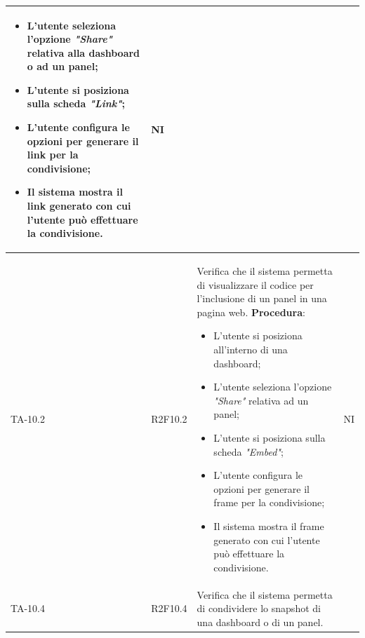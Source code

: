 \begin{longtable}{|C{2.5cm}|C{2.5cm}|L{6.5cm}|C{1.5cm}|}
\begin{itemize}
		\item L'utente seleziona l'opzione \emph{"Share"} relativa alla dashboard o ad un panel;
		\item L'utente si posiziona sulla scheda \emph{"Link"};
		\item L'utente configura le opzioni per generare il link per la condivisione;
		\item Il sistema mostra il link generato con cui l'utente può effettuare la condivisione.
	\end{itemize}
	 & {NI}\\
	\hline
	{TA-10.2} & {R2F10.2} & 
	Verifica che il sistema permetta di visualizzare il codice per l'inclusione di un panel in una pagina web.
	\textbf{Procedura}:
	\begin{itemize}		
		\item L'utente si posiziona all'interno di una dashboard;
		\item L'utente seleziona l'opzione \emph{"Share"} relativa ad un panel;
		\item L'utente si posiziona sulla scheda \emph{"Embed"};
		\item L'utente configura le opzioni per generare il frame per la condivisione;
		\item Il sistema mostra il frame generato con cui l'utente può effettuare la condivisione.
	\end{itemize}
	 & {NI}\\
	\hline
	{TA-10.4} & {R2F10.4} & 
	Verifica che il sistema permetta di condividere lo snapshot di una dashboard o di un
	panel.


\end{longtable}
